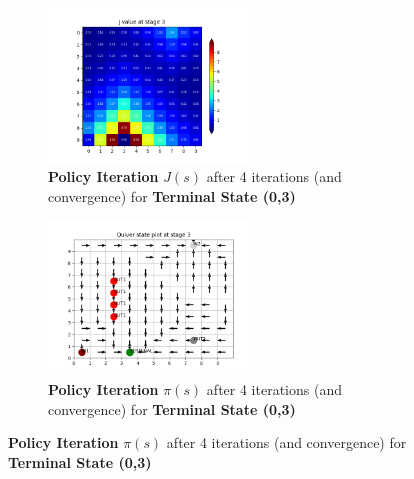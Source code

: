 \begin{figure}[h]
\begin{subfigure}
\centering
\includegraphics[angle=0,width=0.6\textwidth]{hw4/logs/policy_iter_t=3_N=20/J-heatmap-3.png}
\caption{ \textbf{Policy Iteration} $J(s)$  after 4 iterations (and convergence) for \textbf{Terminal State (0,3)}}
\end{subfigure}

\begin{subfigure}
\centering
\includegraphics[angle=0,width=0.6\textwidth]{hw4/logs/policy_iter_t=3_N=20/quiver-3.png}
\caption{ \textbf{Policy Iteration}  $\pi(s)$ after 4 iterations (and convergence) for \textbf{Terminal State (0,3)}}
\end{subfigure}
\end{figure}



